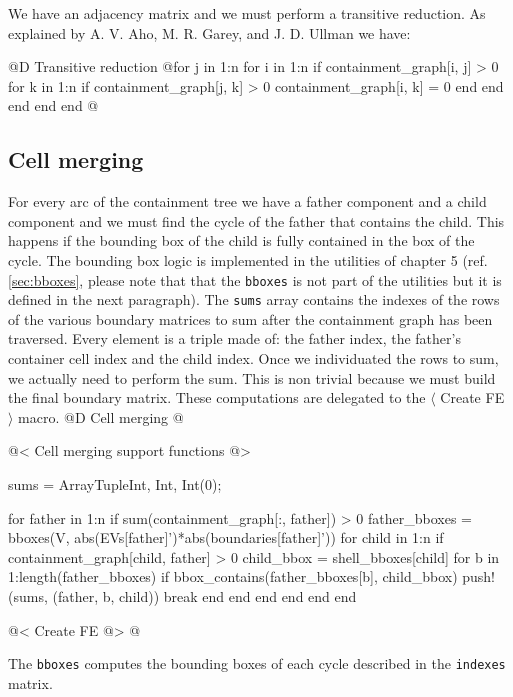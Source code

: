 We have an adjacency matrix and we must perform a transitive reduction.
As explained by A. V. Aho, M. R. Garey, and J. D. Ullman \cite{parallel_transitive_reduction}
we have:

@D Transitive reduction
@{for j in 1:n
    for i in 1:n
        if containment_graph[i, j] > 0
            for k in 1:n
                if containment_graph[j, k] > 0
                    containment_graph[i, k] = 0
                end
            end
        end
    end
end
@}

\subsection{Cell merging}

For every arc of the containment tree we have a father component 
and a child component and we must find the cycle of the father that
contains the child. This happens if the bounding box of the child is fully
contained in the box of the cycle. The bounding box logic is implemented
in the utilities of chapter 5 (ref. \ref{sec:bboxes}, please note that
that the \texttt{bboxes} is not part of the utilities but it is defined 
in the next paragraph). The \texttt{sums} array contains the indexes of 
the rows of the various boundary matrices to sum after the containment 
graph has been traversed. Every element is a triple made of: the father 
index, the father's container cell index and the child index.
Once we individuated the rows to sum, we actually need to perform the sum.
This is non trivial because we must build the final boundary matrix.
These computations are delegated to the $\langle$ Create FE $\rangle$ macro.
@D Cell merging
@{@< Cell merging support functions @>

sums = Array{Tuple{Int, Int, Int}}(0);

for father in 1:n
    if sum(containment_graph[:, father]) > 0
        father_bboxes = bboxes(V, abs(EVs[father]')*abs(boundaries[father]'))
        for child in 1:n
            if containment_graph[child, father] > 0
                child_bbox = shell_bboxes[child]
                for b in 1:length(father_bboxes)
                    if bbox_contains(father_bboxes[b], child_bbox)
                        push!(sums, (father, b, child))
                        break
                    end
                end
            end            
        end
    end
end

@< Create FE @>
@}

The \texttt{bboxes} computes the bounding boxes of each cycle
described in the \texttt{indexes} matrix.

